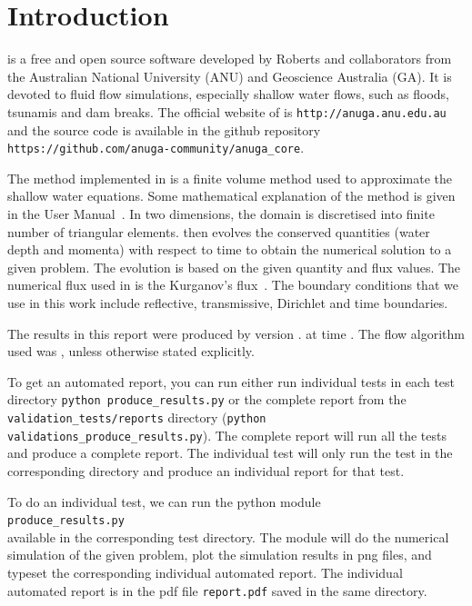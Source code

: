 
\chapter{Introduction}
\anuga{} is a free and open source software developed by Roberts and collaborators from the Australian
National University (ANU) and Geoscience Australia (GA). It is devoted to fluid flow simulations,
especially shallow water flows, such as floods, tsunamis and dam breaks. The official website of
\anuga{} is \verb|http://anuga.anu.edu.au| and the source code is available in the github repository 
\verb|https://github.com/anuga-community/anuga_core|.



The method implemented in \anuga{} is a finite volume method used to
approximate the shallow water equations. Some mathematical explanation of the method
is given in the \anuga{} User Manual~\cite{RNGS2010}. In two dimensions, the
domain is discretised into finite number of triangular elements. \anuga{}
then evolves the conserved quantities (water depth and momenta) with respect
to time to obtain the numerical solution to a given problem. The evolution
is based on the given quantity and flux values. The numerical flux used in
\anuga{} is the Kurganov's flux~\cite{KNP2001, KL2002}. The boundary conditions
that we use in this work include reflective, transmissive, Dirichlet
and time boundaries.


The results in this report were produced by \anuga{} version \majorR{}.\minorR{} at time \timeR.
The flow algorithm used was \alg{}, unless otherwise stated explicitly.

To get an automated report, you can run either run individual tests in each 
test directory \verb|python produce_results.py| or the complete report from the 
\verb|validation_tests/reports| directory (\verb|python validations_produce_results.py|). 
The complete report will run all the tests and produce a complete report. 
The individual test will only run the test in the corresponding directory and
 produce an individual report for that test.

To do an individual test, we can run the python module \\
\verb|produce_results.py| \\
available in the corresponding test directory. The module will do the
numerical simulation of the given problem, plot the simulation
results in png files, and typeset the corresponding
individual automated report. The individual automated report is in
the pdf file \verb|report.pdf| saved in the same directory.


